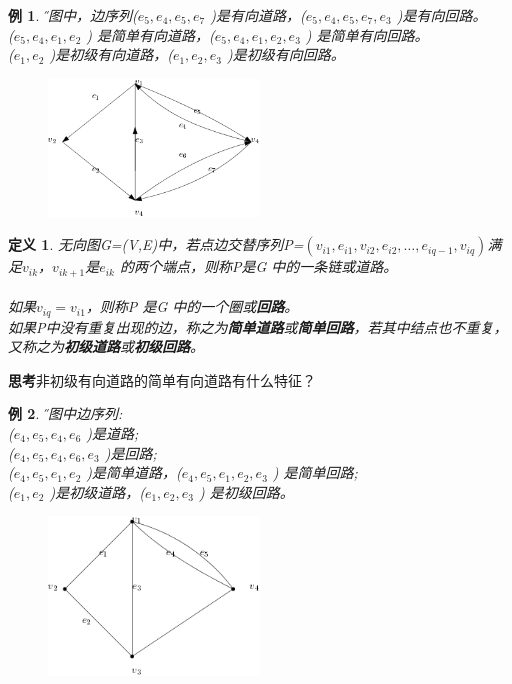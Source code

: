 \documentclass[11pt,a4paper,openany]{book}
\newtheorem{defination}{\textbf{定义}}[section]
\newtheorem{sample}{\textbf{例}}[section]
\begin{document}
\begin{sample}\H 下图中，边序列($e_5,e_4,e_5,e_7$ )是有向道路，($e_5,e_4,e_5,e_7,e_3$ )是有向回路。\\
($e_5,e_4,e_1,e_2$ ) 是简单有向道路，($e_5,e_4,e_1,e_2,e_3$ ) 是简单有向回路。\\
($e_1,e_2$ )是初级有向道路，($e_1,e_2,e_3$ )是初级有向回路。
\begin{figure}[H]
  \centering
  \includegraphics[width=0.5\textwidth]{2.1.png}\\
\caption{}\label{fig:2.1}
\end{figure}
\end{sample}
\begin{defination}\K
无向图G=(V,E)中，若点边交替序列P=$(v_{i1},e_{i1},v_{i2},e_{i2},\dots,e_{iq-1},v_{iq} )$满足$v_{ik}$，$v_{ik+1}$是$e_{ik}$ 的两个端点，则称P是G 中的一条链或道路。\\
\\
如果$v_{iq}=v_{i1}$，则称P 是G 中的一个圈或\textbf{回路}。\\
\noindent 如果P中没有重复出现的边，称之为\textbf{简单道路}或\textbf{简单回路}，若其中结点也不重复，又称之为\textbf{初级道路}或\textbf{初级回路}。
\end{defination}
\textbf{思考}非初级有向道路的简单有向道路有什么特征？
\begin{sample}\H
下图中边序列:\\
($e_4,e_5,e_4,e_6$ )是道路;\\
($e_4,e_5,e_4,e_6,e_3$ )是回路;\\
($e_4,e_5,e_1,e_2$ )是简单道路，($e_4,e_5,e_1,e_2,e_3$ ) 是简单回路;\\
($e_1,e_2$ )是初级道路，($e_1,e_2,e_3$ ) 是初级回路。
\begin{figure}[H]
  \centering
  \includegraphics[width=0.5\textwidth]{2.2.png}\\
\caption{}\label{fig:2.2}
\end{figure}
\end{sample}
\end{document}
